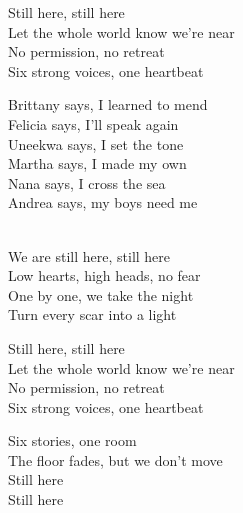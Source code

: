 \begin{lyrics}
Still here, still here\\
Let the whole world know we’re near\\
No permission, no retreat\\
Six strong voices, one heartbeat

Brittany says, I learned to mend\\
Felicia says, I’ll speak again\\
Uneekwa says, I set the tone\\
Martha says, I made my own\\
Nana says, I cross the sea\\
Andrea says, my boys need me

\\
We are still here, still here\\
Low hearts, high heads, no fear\\
One by one, we take the night\\
Turn every scar into a light

Still here, still here\\
Let the whole world know we’re near\\
No permission, no retreat\\
Six strong voices, one heartbeat

Six stories, one room\\
The floor fades, but we don’t move\\
Still here\\
Still here
\end{lyrics}

